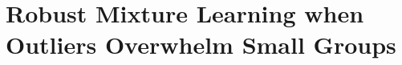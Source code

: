 \chapter[Robust mixture learning]{Robust Mixture Learning when Outliers Overwhelm Small Groups}
\label{chap:robust}







